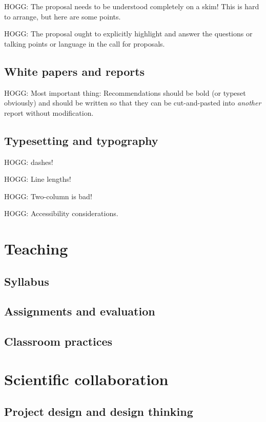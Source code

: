 \documentclass[letterpaper]{book}
\begin{document}
HOGG: The proposal needs to be understood completely on a skim! This is hard to arrange, but here are some points.

HOGG: The proposal ought to explicitly highlight and answer the questions or talking points or language in the call for proposals.

\chapter{White papers and reports}

HOGG: Most important thing: Recommendations should be bold (or typeset obviously) and should be written so that they can be cut-and-pasted into \emph{another} report without modification.

\chapter{Typesetting and typography}

HOGG: dashes!

HOGG: Line lengths!

HOGG: Two-column is bad!

HOGG: Accessibility considerations.

\part{Teaching}

\chapter{Syllabus}

\chapter{Assignments and evaluation}

\chapter{Classroom practices}

\part{Scientific collaboration}

\chapter{Project design and design thinking}
\end{document}
